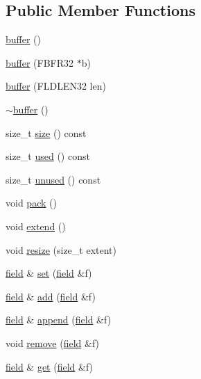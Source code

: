 \subsection*{Public Member Functions}
\begin{DoxyCompactItemize}
\item 
\hyperlink{classatmi_1_1buffer_ab5a434d367c856f9b1b7c831b98ff0d3}{buffer} ()
\item 
\hyperlink{classatmi_1_1buffer_a5a2836413da6d30d25afa2ea242cd90d}{buffer} (F\+B\+F\+R32 $\ast$b)
\item 
\hyperlink{classatmi_1_1buffer_ae2bc183e6b0909b8155dcfa17686a574}{buffer} (F\+L\+D\+L\+E\+N32 len)
\item 
\hyperlink{classatmi_1_1buffer_aa58097eacc94f1f5cc5e99b434ec7135}{$\sim$buffer} ()
\item 
size\+\_\+t \hyperlink{classatmi_1_1buffer_a8228f64305e566b8133e8ee746c6d2bb}{size} () const 
\item 
size\+\_\+t \hyperlink{classatmi_1_1buffer_a4ab660c5750cb0793eb99782fd36c0fa}{used} () const 
\item 
size\+\_\+t \hyperlink{classatmi_1_1buffer_a30b054d9d60238f34463d4bcd5ac3e16}{unused} () const 
\item 
void \hyperlink{classatmi_1_1buffer_ab9294b1a1e54e35717db40cb6bbb6de1}{pack} ()
\item 
void \hyperlink{classatmi_1_1buffer_a853e2a0585dda4e23ffa04297b824afb}{extend} ()
\item 
void \hyperlink{classatmi_1_1buffer_a95d13597c2f28bfc8ee5dac4db131179}{resize} (size\+\_\+t extent)
\item 
\hyperlink{classatmi_1_1field}{field} \& \hyperlink{classatmi_1_1buffer_a1fe98844cb17328390b3d4e658bd6903}{set} (\hyperlink{classatmi_1_1field}{field} \&f)
\item 
\hyperlink{classatmi_1_1field}{field} \& \hyperlink{classatmi_1_1buffer_a5f30826d8273b619380e8b4f039af094}{add} (\hyperlink{classatmi_1_1field}{field} \&f)
\item 
\hyperlink{classatmi_1_1field}{field} \& \hyperlink{classatmi_1_1buffer_a4a9abeb69354fa575c8b27c9af170e79}{append} (\hyperlink{classatmi_1_1field}{field} \&f)
\item 
void \hyperlink{classatmi_1_1buffer_a4a1ef484befbf22aca919fc1a312ab61}{remove} (\hyperlink{classatmi_1_1field}{field} \&f)
\item 
\hyperlink{classatmi_1_1field}{field} \& \hyperlink{classatmi_1_1buffer_affb14c05bc21e29c3a2f6dc03c30c0fa}{get} (\hyperlink{classatmi_1_1field}{field} \&f)

\end{DoxyCompactItemize}

